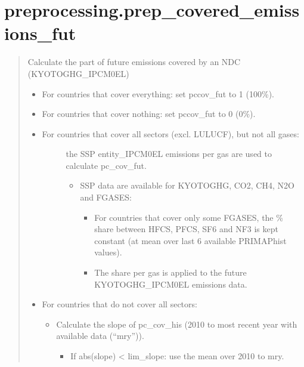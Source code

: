 \documentclass[letterpaper,10pt,english]{sphinxmanual}
\begin{document}
\chapter{preprocessing.prep\_covered\_emissions\_fut}
\label{\detokenize{code:preprocessing-prep-covered-emissions-fut}}
\begin{quote}

Calculate the part of future emissions covered by an NDC (KYOTOGHG\_IPCM0EL)
\begin{itemize}
\item {} 
For countries that cover everything: set pccov\_fut to 1 (100\%).

\item {} 
For countries that cover nothing: set pccov\_fut to 0 (0\%).

\item {} \begin{description}
\item[{For countries that cover all sectors (excl. LULUCF), but not all gases:}] \leavevmode
the SSP entity\_IPCM0EL emissions per gas are used to calculate pc\_cov\_fut.
\begin{itemize}
\item {} 
SSP data are available for KYOTOGHG, CO2, CH4, N2O and FGASES:
\begin{itemize}
\item {} 
For countries that cover only some FGASES, the \% share between HFCS, PFCS, SF6 and NF3 is kept constant (at mean over last 6 available PRIMAP\sphinxhyphen{}hist values).

\item {} 
The share per gas is applied to the future KYOTOGHG\_IPCM0EL emissions data.

\end{itemize}

\end{itemize}

\end{description}

\item {} 
For countries that do not cover all sectors:
\begin{itemize}
\item {} 
Calculate the slope of pc\_cov\_his (2010 to most recent year with available data (“mry”)).
\begin{itemize}
\item {} 
If abs(slope) \textless{} lim\_slope: use the mean over 2010 to mry.


\end{itemize}
\end{itemize}
\end{itemize}
\end{quote}
\end{document}
